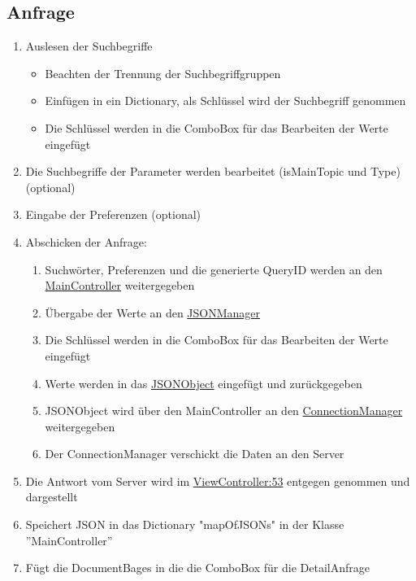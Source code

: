 \subsection{Anfrage}
\begin{enumerate}
  \item Auslesen der Suchbegriffe
    \begin{itemize}
      \item Beachten der Trennung der Suchbegriffgruppen
      \item Einfügen in ein Dictionary, als Schlüssel wird der Suchbegriff genommen
      \item Die Schlüssel werden in die ComboBox für das Bearbeiten der Werte eingefügt
    \end{itemize}
  \item Die Suchbegriffe der Parameter werden bearbeitet (isMainTopic und Type) (optional)
  \item Eingabe der Preferenzen (optional)
  \item Abschicken der Anfrage:
    \begin{enumerate}
      \item Suchwörter, Preferenzen und die generierte QueryID werden an den \href{https://github.com/SECH-Tag-EEXCESS-Browser/iOSX-App/blob/master/Team%20Content/Demos/JSON/Sech/Sech/MainController.swift}{MainController} weitergegeben
      \item Übergabe der Werte an den \href{https://github.com/SECH-Tag-EEXCESS-Browser/iOSX-App/blob/master/Team%20Content/Demos/JSON/Sech/Sech/JSONManager.swift}{JSONManager}
      \item Die Schlüssel werden in die ComboBox für das Bearbeiten der Werte eingefügt
      \item Werte werden in das \href{https://github.com/SECH-Tag-EEXCESS-Browser/iOSX-App/blob/master/Team%20Content/Demos/JSON/Sech/Sech/Json.swift}{JSONObject} eingefügt und zurückgegeben
      \item JSONObject wird über den MainController an den \href{https://github.com/SECH-Tag-EEXCESS-Browser/iOSX-App/blob/master/Team%20Content/Demos/JSON/Sech/Sech/ConnectionManager.swift}{ConnectionManager} weitergegeben
      \item Der ConnectionManager verschickt die Daten an den Server
    \end{enumerate}
  \item Die Antwort vom Server wird im \href{https://github.com/SECH-Tag-EEXCESS-Browser/iOSX-App/blob/master/Team%20Content/Demos/JSON/Sech/Sech/ViewController.swift}{ViewController:53} entgegen genommen und dargestellt
  \item Speichert JSON in das Dictionary "mapOfJSONs" in der Klasse ''MainController''
  \item Fügt die DocumentBages in die die ComboBox für die DetailAnfrage
\end{enumerate}
\pagebreak
